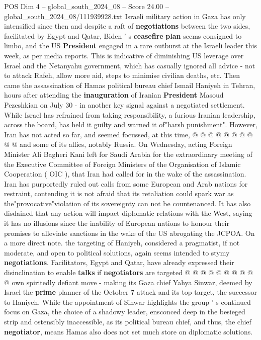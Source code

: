 \begin{textsample}{POS Dim 4 – global\_south\_2024\_08 – Score 24.00 – global\_south\_2024\_08/111939928.txt}
Israeli military action in Gaza has only intensified since then and despite a raft of \textbf{negotiations} between the two sides, facilitated by Egypt and Qatar, Biden ' s \textbf{ceasefire} \textbf{plan} seems consigned to limbo, and the US \textbf{President} engaged in a rare outburst at the Israeli leader this week, as per media reports.
This is indicative of diminishing US leverage over Israel and the Netanyahu government, which has casually ignored all advice - not to attack Rafeh, allow more aid, steps to minimise civilian deaths, etc.
Then came the assassination of Hamas political bureau chief Ismail Haniyeh in Tehran, hours after attending the \textbf{inauguration} of Iranian \textbf{President} Masoud Pezeshkian on July 30 - in another key signal against a negotiated settlement.
While Israel has refrained from taking responsibility, a furious Iranian leadership, across the board, has held it guilty and warned it of"harsh punishment".
However, Iran has not acted so far, and seemed focussed, at this time, @ @ @ @ @ @ @ @ @ @ and some of its allies, notably Russia.
On Wednesday, acting Foreign Minister Ali Bagheri Kani left for Saudi Arabia for the extraordinary meeting of the Executive Committee of Foreign Ministers of the Organisation of Islamic Cooperation ( OIC ), that Iran had called for in the wake of the assassination.
Iran has purportedly ruled out calls from some European and Arab nations for restraint, contending it is not afraid that its retaliation could spark war as the"provocative"violation of its sovereignty can not be countenanced.
It has also disdained that any action will impact diplomatic relations with the West, saying it has no illusions since the inability of European nations to honour their promises to alleviate sanctions in the wake of the US abrogating the JCPOA.
On a more direct note. the targeting of Haniyeh, considered a pragmatist, if not moderate, and open to political solutions, again seems intended to stymy \textbf{negotiations}.
Facilitators, Egypt and Qatar, have already expressed their disinclination to enable \textbf{talks} if \textbf{negotiators} are targeted @ @ @ @ @ @ @ @ @ @ own spiritedly defiant move - making its Gaza chief Yahya Sinwar, deemed by Israel the \textbf{prime} planner of the October 7 attack and its top target, the successor to Haniyeh.
While the appointment of Sinwar highlights the group ' s continued focus on Gaza, the choice of a shadowy leader, ensconced deep in the besieged strip and ostensibly inaccessible, as its political bureau chief, and thus, the chief \textbf{negotiator}, means Hamas also does not set much store on diplomatic solutions.

\end{textsample}

